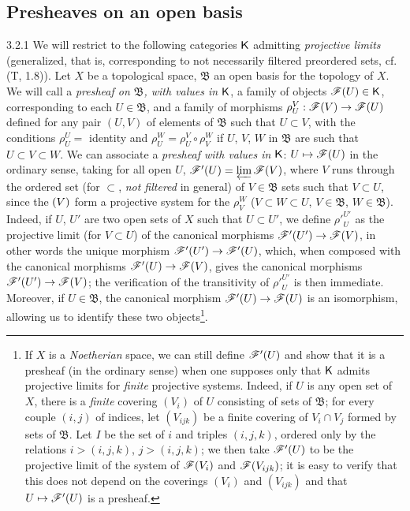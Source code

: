 \subsection{Presheaves on an open basis}
\label{0-prelim-3.2}

\begin{env}{3.2.1}
\label{env-0.3.2.1}
We will restrict to the following categories $\mathsf{K}$ admitting \emph{projective
limits} (generalized, that is, corresponding to not necessarily filtered
preordered sets, cf. (T, 1.8)). Let $X$ be a topological space, $\mathfrak{B}$
an open basis for the topology of $X$. We will call a \emph{presheaf on
$\mathfrak{B}$, with values in $\mathsf{K}$}, a family of objects $\mathscr{F}(U)\in\mathsf{K}$,
corresponding to each $U\in\mathfrak{B}$, and a family of morphisms $\rho_U^V:\mathscr{F}(V)\to\mathscr{F}(U)$ defined for any pair $(U,V)$ of elements of
$\mathfrak{B}$ such that $U\subset V$,
with the conditions $\rho_U^U=$ identity and $\rho_U^W=\rho_U^V\circ\rho_V^W$ if
$U$, $V$, $W$ in $\mathfrak{B}$ are such that $U\subset V\subset W$. We can
associate a \emph{presheaf with values in $\mathsf{K}$}: $U\mapsto\mathscr{F}(U)$ in the
ordinary sense, taking for all open $U$, $\mathscr{F}'(U)=\varprojlim\mathscr{F}(V)$,
where $V$ runs through the ordered set (for $\subset$, \emph{not filtered} in
general) of $V\in\mathfrak{B}$ sets such that $V\subset U$, since the $\mathscr(V)$
form a projective system for the $\rho_V^W$ ($V\subset W\subset U$,
$V\in\mathfrak{B}$, $W\in\mathfrak{B}$). Indeed, if $U$, $U'$ are two open sets
of $X$ such that $U\subset U'$, we define ${\rho'}_U^{U'}$ as the projective
limit (for $V\subset U$) of the canonical morphisms $\mathscr{F}'(U')\to\mathscr{F}(V)$,
in other words the unique morphism $\mathscr{F}'(U')\to\mathscr{F}'(U)$, which, when
composed with the canonical morphisms $\mathscr{F}'(U)\to\mathscr{F}(V)$, gives the
canonical morphisms $\mathscr{F}'(U')\to\mathscr{F}(V)$; the verification of the
transitivity of ${\rho'}_U^{U'}$ is then immediate. Moreover, if
$U\in\mathfrak{B}$, the canonical morphism $\mathscr{F}'(U)\to\mathscr{F}(U)$ is an
isomorphism, allowing us to identify these two objects\footnote{If $X$ is a
\emph{Noetherian} space, we can still define $\mathscr{F}'(U)$ and show that it is a
presheaf (in the ordinary sense) when one supposes only that $\mathsf{K}$ admits
projective limits for \emph{finite} projective systems. Indeed, if $U$ is any
open set of $X$, there is a \emph{finite} covering $(V_i)$ of $U$ consisting of
sets of $\mathfrak{B}$; for every couple $(i,j)$ of indices, let $(V_{ijk})$ be
a finite covering of $V_i\cap V_j$ formed by sets of $\mathfrak{B}$. Let $I$ be
the set of $i$ and triples $(i,j,k)$, ordered only by the relations $i>(i,j,k)$,
$j>(i,j,k)$; we then take $\mathscr{F}'(U)$ to be the projective limit of the system
of $\mathscr{F}(V_i)$ and $\mathscr{F}(V_{ijk})$; it is easy to verify that this does not
depend on the coverings $(V_i)$ and $(V_{ijk})$ and that $U\mapsto\mathscr{F}'(U)$ is
a presheaf.}.
\end{env}

